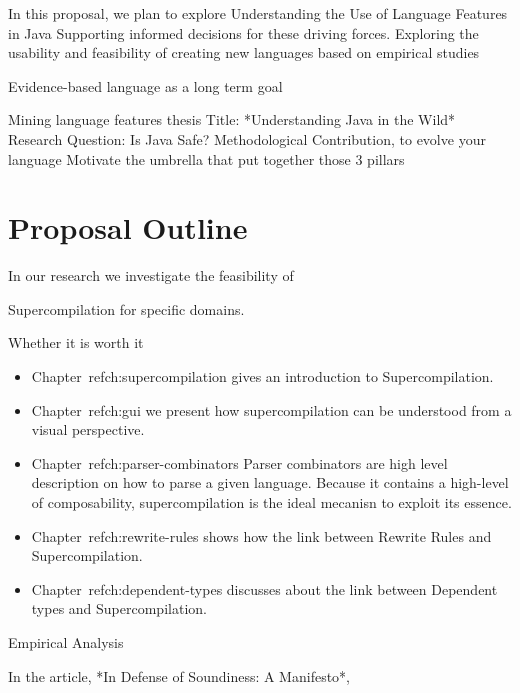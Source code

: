 In this proposal, we plan to explore
Understanding the Use of Language Features in Java
Supporting informed decisions for these driving forces.
Exploring the usability and feasibility of creating new languages based on empirical studies



Evidence-based language as a long term goal

Mining language features thesis
Title: *Understanding Java in the Wild*
Research Question: Is Java Safe?
Methodological Contribution, to evolve your language
Motivate the umbrella that put together those 3 pillars





\section{Proposal Outline}

In our research we investigate the feasibility of 

Supercompilation for specific domains.

Whether it is worth it

\begin{itemize}

\item Chapter~ref{ch:supercompilation} gives an introduction to Supercompilation.

\item Chapter~ref{ch:gui} we present how supercompilation can be understood from a visual perspective.

\item Chapter~ref{ch:parser-combinators} Parser combinators are high level description on how to parse a given language.
Because it contains a high-level of composability, supercompilation is the ideal mecanisn to exploit its essence.

\item Chapter~ref{ch:rewrite-rules} shows how the link between Rewrite Rules and Supercompilation.

\item Chapter~ref{ch:dependent-types} discusses about the link between Dependent types and Supercompilation.

\end{itemize}


Empirical Analysis


In the article, *In Defense of Soundiness: A Manifesto*,

